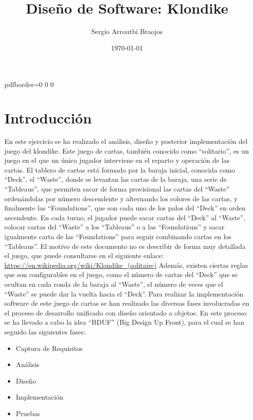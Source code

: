 \documentclass[11pt]{article}
\title{\textbf{Diseño de Software: Klondike}}
\author{Sergio Arroutbi Braojos}
\date{\today}
\begin{document}
\hypersetup
{   
pdfborder={0 0 0}
}
   
\maketitle

\tableofcontents

\pagebreak

\section{Introducción}
En este ejercicio se ha realizado el análisis, diseño y posterior implementación del juego del klondike. Este juego de cartas, también conocido como ``solitario'', es un juego en el que un único jugador interviene en el reparto y operación de las cartas. El tablero de cartas está formado por la baraja inicial, conocida como ``Deck'', el ``Waste'', donde se levantan las cartas de la baraja, una serie de ``Tableaus'', que permiten sacar de forma provisional las cartas del ``Waste'' ordenándolas por número descendente y alternando los colores de las cartas, y finalmente las ``Foundations'', que son cada uno de los palos del ``Deck'' en orden ascendente.
En cada turno, el jugador puede sacar cartas del ``Deck'' al ``Waste'', colocar cartas del ``Waste'' a los ``Tableaus'' o a las ``Foundations'' y sacar igualmente carta de las ``Foundations'' para seguir combinando cartas en los ``Tableaus''.
El motivo de este documento no es describir de forma muy detallada el juego, que puede consultarse en el siguiente enlace: \url{https://en.wikipedia.org/wiki/Klondike_(solitaire)}
Además, existen ciertas reglas que son configurables en el juego, como el número de cartas del ``Deck'' que se ocultan en cada ronda de la baraja al ``Waste'', el número de veces que el ``Waste'' se puede dar la vuelta hacia el ``Deck''.
Para realizar la implementación software de este juego de cartas se han realizado las diversas fases involucradas en el proceso de desarrollo unificado con diseño orientado a objetos. En este proceso se ha llevado a cabo la idea ``BDUF'' (Big Design Up Front), para el cual se han seguido las siguientes fases:

\begin{itemize}\itemsep0pt
\item{Captura de Requisitos}
\item{Análisis}
\item{Diseño}
\item{Implementación}
\item{Pruebas}
\end{itemize}
\end{document}

